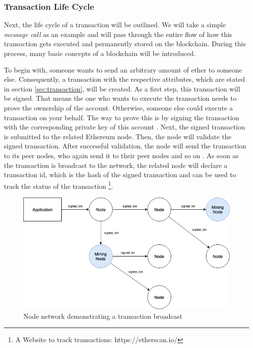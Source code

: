 \subsubsection{Transaction Life Cycle}
\label{sec:transaction_lifecycle}
Next, the life cycle of a transaction will be outlined. 
We will take a simple \textit{message call} as an example 
and will pass through the entire flow of how this transaction 
gets executed and permanently stored on the blockchain. 
During this process, many basic concepts of a blockchain will be introduced. 

To begin with, someone wants to send an arbitrary amount of ether to someone else. 
Consequently, a transaction with the respective attributes, which are stated 
in section \ref{sec:transaction}, will be created. As a first step, this transaction 
will be signed. That means the one who wants to execute the transaction needs to prove the 
ownership of the account. Otherwise, someone else could execute a transaction on your behalf. 
The way to prove this is by signing the transaction with the corresponding private
key of this account . 
Next, the signed transaction is submitted to the related Ethereum node. 
Then, the node will validate the signed transaction. 
After successful validation, the node will send the transaction to 
its peer nodes, who again send it to their 
peer nodes and so on . 
As soon as the transaction is broadcast to the network, 
the related node will declare a transaction id, which is the hash 
of the signed transaction and can be used to track the 
status of the transaction \footnote{A Website to track transactions: https://etherscan.io/}. 

\begin{figure}[htbp]
	\centering
	\includegraphics[width=.7\linewidth]{./figures/node_network.png}
	\caption{Node network demonstrating a transaction broadcast}
	\label{figure:node_network}
\end{figure}

